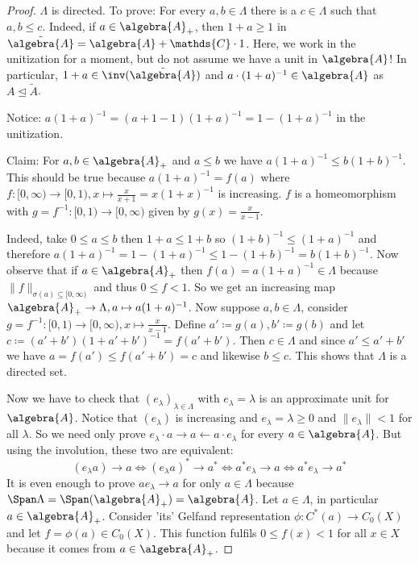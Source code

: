 \documentclass[a4paper]{article}
\begin{document}
\begin{proof}
	$\Lambda$ is directed. To prove: For every $a,b \in \Lambda$ there is a $c \in \Lambda$ such that $a,b \leq c$.
	Indeed, if $a \in \algebra{A}_+$, then $1 + a \geq 1$ in $\tilde{\algebra{A}} = \algebra{A} + \mathds{C} \cdot 1$.
	Here, we work in the unitization for a moment, but do not assume we have a unit in $\algebra{A}$!
	In particular, $1 + a \in \inv (\tilde{\algebra{A}})$ and $a \cdot (1 + a)^{-1} \in \algebra{A}$ as $A \trianglelefteq \tilde{A}$.

	Notice: $ a (1 + a)^{-1} = (a + 1 - 1)(1 + a)^{-1} = 1 - (1+a)^{-1}$ in the unitization.

	Claim: For $a, b \in \algebra{A}_+$ and $a \leq b$ we have $a (1 + a)^{-1} \leq b (1+b)^{-1}$.
	This should be true because $a (1 + a)^{-1} = f(a)$ where $f: [0, \infty) \to [0,1), x \mapsto \frac{x}{x+1} = x (1+x)^{-1}$ is increasing.
	$f$ is a homeomorphism with $g = f^{-1}: [0,1) \to [0, \infty)$ given by $g(x) = \frac{x}{x-1}$.

	Indeed, take $0 \leq a \leq b$ then $1 + a \leq 1 + b$ so $(1 + b)^{-1} \leq (1 + a)^{-1}$ and therefore $a(1+a)^{-1} = 1 - (1 + a)^{-1} \leq 1 - (1 + b)^{-1} = b(1+b)^{-1}$.
	Now observe that if $a \in \algebra{A}_+$ then $f(a) = a(1+a)^{-1} \in \Lambda$ because $\|f\|_{\sigma(a) \subseteq [0, \infty)}$ and thus $0 \leq f < 1$.
	So we get an increasing map $\algebra{A}_+ \to \Lambda, a \mapsto a(1+a)^{-1}$.
	Now suppose $a,b \in \Lambda$, consider $g = f^{-1}: [0,1) \to [0, \infty), x \mapsto \frac{x}{x-1}$.
	Define $a' \coloneqq g(a), b' \coloneqq g(b)$ and let $c \coloneqq (a' + b')(1 + a' + b')^{-1} = f(a' + b')$.
	Then $c \in \Lambda$ and since $a' \leq a' + b'$ we have $a = f(a') \leq f(a' + b') = c$ and likewise $b \leq c$.
	This shows that $\Lambda$ is a directed set.

	Now we have to check that $(e_\lambda)_{\lambda \in \Lambda}$ with $e_\lambda = \lambda$ is an approximate unit for $\algebra{A}$.
	Notice that $(e_\lambda)$ is increasing and $e_\lambda = \lambda \geq 0$ and $\|e_\lambda\| < 1$ for all $\lambda$.
	So we need only prove $e_\lambda \cdot a \to a \leftarrow a \cdot e_\lambda$ for every $a \in \algebra{A}$.
	But using the involution, these two are equivalent:
	\begin{equation*}
		(e_\lambda a) \to a \iff (e_\lambda a)^* \to a^* \iff a^* e_\lambda \to a \iff a^* e_\lambda \to a^*
	\end{equation*}
	It is even enough to prove $a e_\lambda \to a$ for only $a \in \Lambda$ because $\Span \Lambda = \Span(\algebra{A}_+) = \algebra{A}$.
	Let $a \in \Lambda$, in particular $a \in \algebra{A}_+$.
	Consider 'its' Gelfand representation $ \phi: C^*(a) \to C_0(X)$ and let $f = \phi(a) \in C_0(X)$.
	This function fulfils $0 \leq f(x) < 1$ for all $x \in X$ because it comes from $a \in \algebra{A}_+$.


\end{proof}
\end{document}
